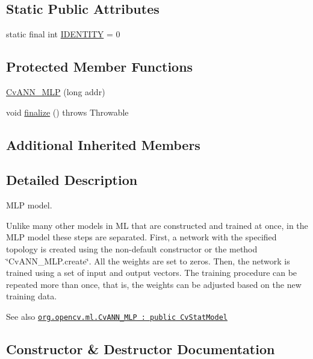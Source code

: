 \subsection*{Static Public Attributes}
\begin{DoxyCompactItemize}
\item 
static final int \mbox{\hyperlink{classorg_1_1opencv_1_1ml_1_1_cv_a_n_n___m_l_p_aefd633244286d7dfa041049f7a21d1c0}{I\+D\+E\+N\+T\+I\+TY}} = 0
\end{DoxyCompactItemize}
\subsection*{Protected Member Functions}
\begin{DoxyCompactItemize}
\item 
\mbox{\hyperlink{classorg_1_1opencv_1_1ml_1_1_cv_a_n_n___m_l_p_a930f8905ac5fb30c3a078af937db77f9}{Cv\+A\+N\+N\+\_\+\+M\+LP}} (long addr)
\item 
void \mbox{\hyperlink{classorg_1_1opencv_1_1ml_1_1_cv_a_n_n___m_l_p_a3f1c0f088a3b739fb6ddd63d7a9d5f9c}{finalize}} ()  throws Throwable 
\end{DoxyCompactItemize}
\subsection*{Additional Inherited Members}


\subsection{Detailed Description}
M\+LP model.

Unlike many other models in ML that are constructed and trained at once, in the M\+LP model these steps are separated. First, a network with the specified topology is created using the non-\/default constructor or the method \char`\"{}\+Cv\+A\+N\+N\+\_\+\+M\+L\+P.\+create\char`\"{}. All the weights are set to zeros. Then, the network is trained using a set of input and output vectors. The training procedure can be repeated more than once, that is, the weights can be adjusted based on the new training data.

\begin{DoxySeeAlso}{See also}
\href{http://docs.opencv.org/modules/ml/doc/neural_networks.html#cvann-mlp}{\tt org.\+opencv.\+ml.\+Cv\+A\+N\+N\+\_\+\+M\+LP \+: public Cv\+Stat\+Model} 
\end{DoxySeeAlso}


\subsection{Constructor \& Destructor Documentation}
\mbox{\label{classorg_1_1opencv_1_1ml_1_1_cv_a_n_n___m_l_p_a930f8905ac5fb30c3a078af937db77f9}} 
